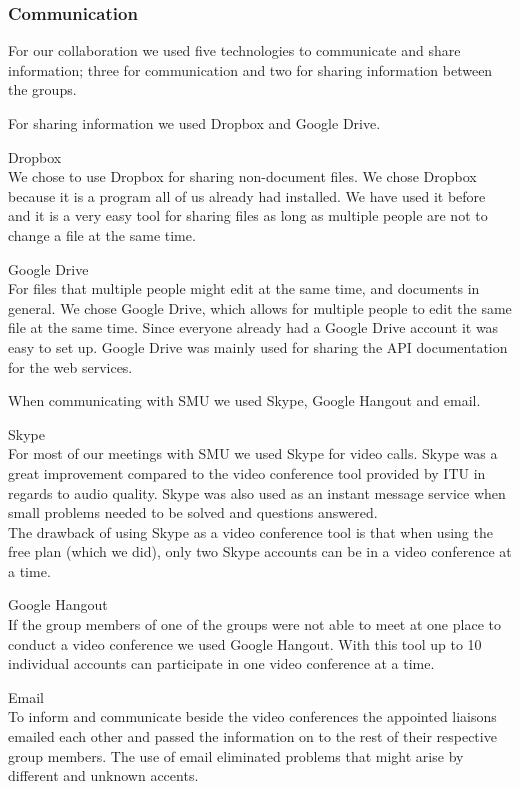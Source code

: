 \subsubsection{Communication}
For our collaboration we used five technologies to communicate and share information; three for communication and two for sharing information between the groups. 

For sharing information we used Dropbox and Google Drive. \vspace{-4mm}
\begin{description}
	\item Dropbox \\
		We chose to use Dropbox for sharing non-document files. We chose Dropbox because it is a program all of us already had installed. We have used it before and it is a very easy tool for sharing files as long as multiple people are not to change a file at the same time.
	\item Google Drive \\
		For files that multiple people might edit at the same time, and documents in general. We chose Google Drive, which allows for multiple people to edit the same file at the same time. Since everyone already had a Google Drive account it was easy to set up.
		Google Drive was mainly used for sharing the API documentation for the web services.
\end{description}

When communicating with SMU we used Skype, Google Hangout and email.
\vspace{-4mm}
\begin{description}
	\item Skype \\
		For most of our meetings with SMU we used Skype for video calls. Skype was a great improvement compared to the video conference tool provided by ITU in regards to audio quality.
		Skype was also used as an instant message service when small problems needed to be solved and questions answered. \\
		The drawback of using Skype as a video conference tool is that when using the free plan (which we did), only two Skype accounts can be in a video conference at a time.
	\item Google Hangout \\
		If the group members of one of the groups were not able to meet at one place to conduct a video conference we used Google Hangout. With this tool up to 10 individual accounts can participate in one video conference at a time.
	\item Email \\
		To inform and communicate beside the video conferences the appointed liaisons emailed each other and passed the information on to the rest of their respective group members.
		The use of email eliminated problems that might arise by different and unknown accents.
\end{description}